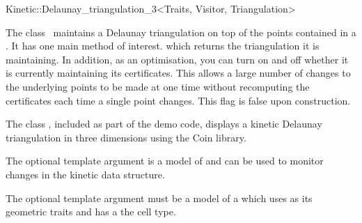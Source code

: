 

\begin{ccRefClass}{Kinetic::Delaunay_triangulation_3<Traits, Visitor, Triangulation>}  %


\ccDefinition
  
The class \ccRefName\ maintains a Delaunay triangulation on top of the
points contained in a . It has one main method
of interest.  which returns the triangulation it
is maintaining. In addition, as an optimisation, you can turn on and
off whether it is currently maintaining its certificates. This allows
a large number of changes to the underlying points to be made at one
time without recomputing the certificates each time a single point
changes. This flag is false upon construction.

The class , included as part
of the demo code, displays a kinetic Delaunay triangulation in three
dimensions using the Coin library.

The optional  template argument is a model of
 and can be used to monitor
changes in the kinetic data structure.

The optional  template argument must be a model of
a  which uses
 as its geometric traits and has
 a the cell
type.



\ccTypes




\end{ccRefClass}
